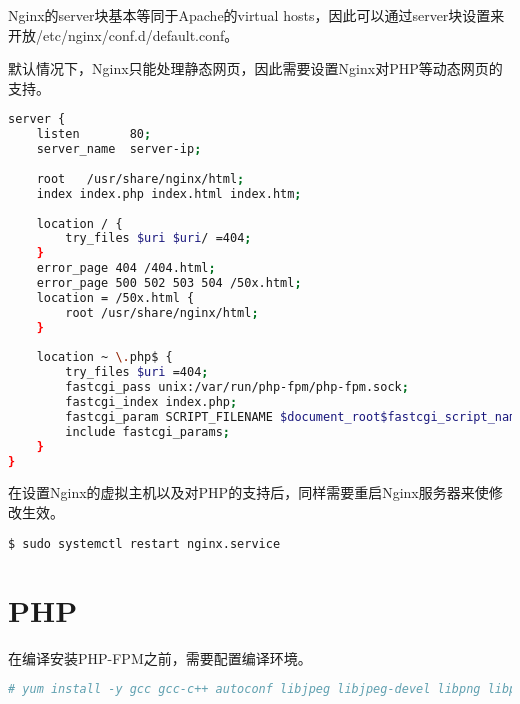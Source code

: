 \begin{lstlisting}[language=bash]

\end{lstlisting}


Nginx的server块基本等同于Apache的virtual hosts，因此可以通过server块设置来开放/etc/nginx/conf.d/default.conf。

默认情况下，Nginx只能处理静态网页，因此需要设置Nginx对PHP等动态网页的支持。


\begin{lstlisting}[language=bash]
server {
    listen       80;
    server_name  server-ip;
 
    root   /usr/share/nginx/html;
    index index.php index.html index.htm;
 
    location / {
        try_files $uri $uri/ =404;
    }
    error_page 404 /404.html;
    error_page 500 502 503 504 /50x.html;
    location = /50x.html {
        root /usr/share/nginx/html;
    }
 
    location ~ \.php$ {
        try_files $uri =404;
        fastcgi_pass unix:/var/run/php-fpm/php-fpm.sock;
        fastcgi_index index.php;
        fastcgi_param SCRIPT_FILENAME $document_root$fastcgi_script_name;
        include fastcgi_params;
    }
}
\end{lstlisting}

在设置Nginx的虚拟主机以及对PHP的支持后，同样需要重启Nginx服务器来使修改生效。

\begin{lstlisting}[language=bash]
$ sudo systemctl restart nginx.service
\end{lstlisting}



\section{PHP}


在编译安装PHP-FPM之前，需要配置编译环境。

\begin{lstlisting}[language=bash]
# yum install -y gcc gcc-c++ autoconf libjpeg libjpeg-devel libpng libpng-devel freetype freetype-devel libxml2 libxml2-devel zlib zlib-devel glibc glibc-devel glib2 glib2-devel bzip2 bzip2-devel ncurses ncurses-devel curl curl-devel e2fsprogs e2fsprogs-devel krb5 krb5-devel libidn libidn-devel openssl openssl-devel openldap openldap-devel nss_ldap openldap-clients openldap-servers
\end{lstlisting}

